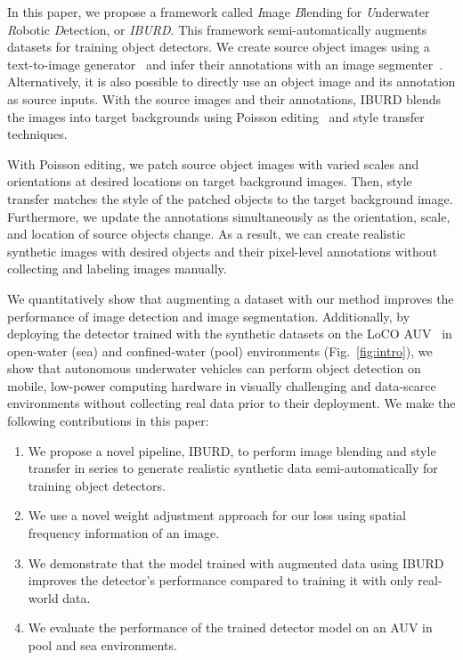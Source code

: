 In this paper, we propose a framework called \textit{I}mage \textit{B}lending for \textit{U}nderwater \textit{R}obotic \textit{D}etection, or \textit{IBURD}.
This framework semi-automatically augments datasets for training object detectors. We create source object images using a text-to-image generator~\cite{ramesh2021zero} and infer their annotations with an image segmenter~\cite{kirillov2023segment}. Alternatively, it is also possible to directly use an object image and its annotation as source inputs. 
With the source images and their annotations, IBURD blends the images into target backgrounds using Poisson editing~\cite{perez_poisson_2003} and style transfer~\cite{zhang_deep_2020} techniques. 

With Poisson editing, we patch source object images with varied scales and orientations at desired locations on target background images. 
Then, style transfer matches the style of the patched objects to the target background image.
Furthermore, we update the annotations simultaneously as the orientation, scale, and location of source objects change. 
As a result, we can create realistic synthetic images with desired objects and their pixel-level annotations without collecting and labeling images manually.



We quantitatively show that augmenting a dataset with our method improves the performance of image detection and image segmentation. 
Additionally, by deploying the detector trained with the synthetic datasets on the LoCO AUV~\cite{loco_paper_2020} in open-water (sea) and confined-water (pool) environments (Fig.~\ref{fig:intro}), we show that autonomous underwater vehicles can perform object detection on mobile, low-power computing hardware in visually challenging and data-scarce environments without collecting real data prior to their deployment. 
We make the following contributions in this paper:
\begin{enumerate}
    \item We propose a novel pipeline, IBURD, to perform image blending and style transfer in series to generate realistic synthetic data semi-automatically for training object detectors.
    \item We use a novel weight adjustment approach for our loss using spatial frequency information of an image.
    \item We demonstrate that the model trained with augmented data using IBURD improves the detector's performance compared to training it with only real-world data.
    \item We evaluate the performance of the trained detector model on an AUV in pool and sea environments.
\end{enumerate}




